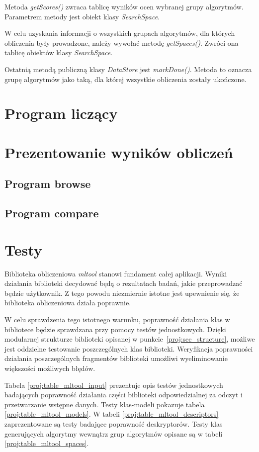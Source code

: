 \documentclass[../thesis.tex]{subfiles}
\begin{document}
Metoda \emph{getScores()} zwraca tablicę wyników ocen wybranej grupy algorytmów. Parametrem metody jest obiekt klasy \emph{SearchSpace}.

W celu uzyskania informacji o wszystkich grupach algorytmów, dla których obliczenia były prowadzone, należy wywołać metodę \emph{getSpaces()}. Zwróci ona tablicę obiektów klasy \emph{SearchSpace}.

Ostatnią metodą publiczną klasy \emph{DataStore} jest \emph{markDone()}. Metoda to oznacza grupę algorytmów jako taką, dla której wszystkie obliczenia zostały ukończone.

\section{Program liczący}

\section{Prezentowanie wyników obliczeń}

\subsection{Program browse}

\subsection{Program compare}

\section{Testy}

Biblioteka obliczeniowa \emph{mltool} stanowi fundament całej aplikacji. Wyniki działania biblioteki decydować będą o rezultatach badań, jakie przeprowadzać będzie użytkownik. Z tego powodu niezmiernie istotne jest upewnienie się, że biblioteka obliczeniowa działa poprawnie. 

W celu sprawdzenia tego istotnego warunku, poprawność działania klas w bibliotece będzie sprawdzana przy pomocy testów jednostkowych. Dzięki modularnej strukturze biblioteki opisanej w punkcie~\ref{proj:sec_structure}, możliwe jest oddzielne testowanie poszczególnych klas biblioteki. Weryfikacja poprawności działania poszczególnych fragmentów biblioteki umożliwi wyeliminowanie większości możliwych błędów.

Tabela \ref{proj:table_mltool_input} prezentuje opis testów jednostkowych badających poprawność działania części biblioteki odpowiedzialnej za odczyt i przetwarzanie wstępne danych. Testy klas-modeli pokazuje tabela \ref{proj:table_mltool_models}. W tabeli \ref{proj:table_mltool_descriptors} zaprezentowane są testy badające poprawność deskryptorów. Testy klas generujących algorytmy wewnątrz grup algorytmów opisane są w tabeli \ref{proj:table_mltool_spaces}.
\end{document}
